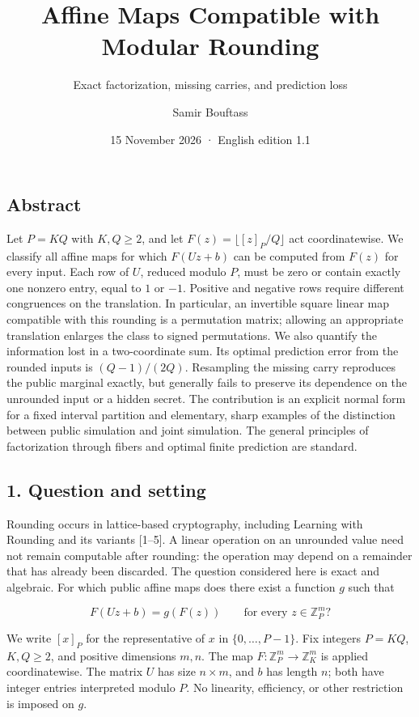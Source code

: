 \documentclass[
]{article}
\title{Affine Maps Compatible with Modular Rounding}
\subtitle{Exact factorization, missing carries, and prediction loss}
\author{Samir Bouftass}
\date{15 November 2026 · English edition 1.1}
\begin{document}
\maketitle

\subsection{Abstract}\label{abstract}

Let \(P=KQ\) with \(K,Q\ge2\), and let \(F(z)=\lfloor[z]_P/Q\rfloor\)
act coordinatewise. We classify all affine maps for which \(F(Uz+b)\)
can be computed from \(F(z)\) for every input. Each row of \(U\),
reduced modulo \(P\), must be zero or contain exactly one nonzero entry,
equal to \(1\) or \(-1\). Positive and negative rows require different
congruences on the translation. In particular, an invertible square
linear map compatible with this rounding is a permutation matrix;
allowing an appropriate translation enlarges the class to signed
permutations. We also quantify the information lost in a two-coordinate
sum. Its optimal prediction error from the rounded inputs is
\((Q-1)/(2Q)\). Resampling the missing carry reproduces the public
marginal exactly, but generally fails to preserve its dependence on the
unrounded input or a hidden secret. The contribution is an explicit
normal form for a fixed interval partition and elementary, sharp
examples of the distinction between public simulation and joint
simulation. The general principles of factorization through fibers and
optimal finite prediction are standard.

\subsection{1. Question and setting}\label{question-and-setting}

Rounding occurs in lattice-based cryptography, including Learning with
Rounding and its variants {[}1--5{]}. A linear operation on an unrounded
value need not remain computable after rounding: the operation may
depend on a remainder that has already been discarded. The question
considered here is exact and algebraic. For which public affine maps
does there exist a function \(g\) such that

\[
F(Uz+b)=g(F(z))\qquad\text{for every }z\in\mathbb Z_P^m?
\tag{1}
\]

We write \([x]_P\) for the representative of \(x\) in
\(\{0,\ldots,P-1\}\). Fix integers \(P=KQ\), \(K,Q\ge2\), and positive
dimensions \(m,n\). The map \(F:\mathbb Z_P^m\to\mathbb Z_K^m\) is
applied coordinatewise. The matrix \(U\) has size \(n\times m\), and
\(b\) has length \(n\); both have integer entries interpreted modulo
\(P\). No linearity, efficiency, or other restriction is imposed on
\(g\).
\end{document}
